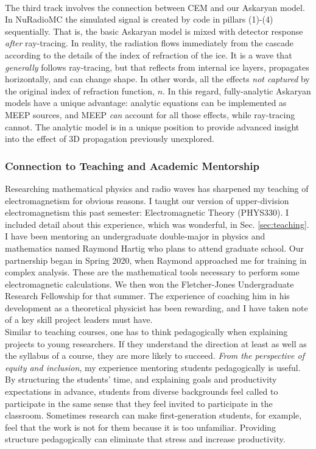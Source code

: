 \documentclass[../../../main.tex]{subfiles}
\begin{document}
\\
\vspace{0.25cm}
The third track involves the connection between CEM and our Askaryan model.  In NuRadioMC the simulated signal is created by code in pillars (1)-(4) sequentially.  That is, the basic Askaryan model is mixed with detector response \textit{after} ray-tracing.  In reality, the radiation flows immediately from the cascade according to the details of the index of refraction of the ice.  It is a wave that \textit{generally} follows ray-tracing, but that reflects from internal ice layers, propagates horizontally, and can change shape.  In other words, all the effects \textit{not captured} by the original index of refraction function, $n$.  In this regard, fully-analytic Askaryan models have a unique advantage: analytic equations can be implemented as MEEP sources, and MEEP \textit{can} account for all those effects, while ray-tracing cannot.  The analytic model is in a unique position to provide advanced insight into the effect of 3D propagation previously unexplored.

\subsubsection{Connection to Teaching and Academic Mentorship}

Researching mathematical physics and radio waves has sharpened my teaching of electromagnetism for obvious reasons.  I taught our version of upper-division electromagnetism this past semester: Electromagnetic Theory (PHYS330).  I included detail about this experience, which was wonderful, in Sec. \ref{sec:teaching}.
\\
\vspace{0.25cm}
I have been mentoring an undergraduate double-major in physics and mathematics named Raymond Hartig who plans to attend graduate school.  Our partnership began in Spring 2020, when Raymond approached me for training in complex analysis.  These are the mathematical tools necessary to perform some electromagnetic calculations.  We then won the Fletcher-Jones Undergraduate Research Fellowship for that summer.  The experience of coaching him in his development as a theoretical physicist has been rewarding, and I have taken note of a key skill project leaders must have.
\\
\vspace{0.25cm}
Similar to teaching courses, one has to think pedagogically when explaining projects to young researchers.  If they understand the direction at least as well as the syllabus of a course, they are more likely to succeed.  \textit{From the perspective of equity and inclusion}, my experience mentoring students pedagogically is useful.  By structuring the students' time, and explaining goals and productivity expectations in advance, students from diverse backgrounds feel called to participate in the same sense that they feel invited to participate in the classroom.  Sometimes research can make first-generation students, for example, feel that the work is not for them because it is too unfamiliar.  Providing structure pedagogically can eliminate that stress and increase productivity.
\end{document}
